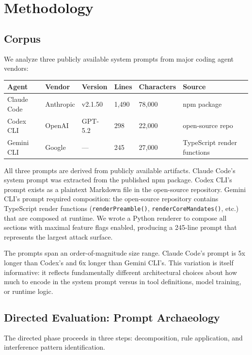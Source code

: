 \section{Methodology}

\subsection{Corpus}

We analyze three publicly available system prompts from major coding
agent vendors:

\begin{table}[t]
\small
\begin{tabular}{@{}llllll@{}}
\toprule
Agent & Vendor & Version & Lines & Characters & Source \\
\midrule
Claude Code & Anthropic & v2.1.50 & 1,490 & 78,000 & npm package \\
Codex CLI & OpenAI & GPT-5.2 & 298 & 22,000 & open-source repo \\
Gemini CLI & Google & --- & 245 & 27,000 & TypeScript render functions \\
\bottomrule
\end{tabular}
\end{table}

All three prompts are derived from publicly available artifacts. Claude
Code's system prompt was extracted from the published npm package. Codex
CLI's prompt exists as a plaintext Markdown file in the open-source
repository. Gemini CLI's prompt required composition: the open-source
repository contains TypeScript render functions
(\texttt{renderPreamble()}, \texttt{renderCoreMandates()}, etc.) that
are composed at runtime. We wrote a Python renderer to compose all
sections with maximal feature flags enabled, producing a 245-line prompt
that represents the largest attack surface.

The prompts span an order-of-magnitude size range. Claude Code's prompt
is 5x longer than Codex's and 6x longer than Gemini CLI's. This
variation is itself informative: it reflects fundamentally different
architectural choices about how much to encode in the system prompt
versus in tool definitions, model training, or runtime logic.

\subsection{Directed Evaluation: Prompt Archaeology}

The directed phase proceeds in three steps: decomposition, rule
application, and interference pattern identification.

